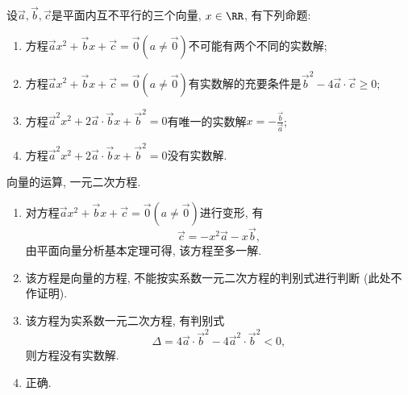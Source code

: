 \documentclass[8pt]{article}
\begin{document}
		\begin{easonbigproblem}
			设\(\vec{a}, \vec{b}, \vec{c}\)是平面内互不平行的三个向量, \(x \in \RR\), 有下列命题:
			\begin{enumerate}[label=\calword{(\arabic*)}]
				\item 方程\(\vec{a} x^2 + \vec{b} x + \vec{c} = \vec{0} (a \neq \vec{0})\)不可能有两个不同的实数解;
				\item 方程\(\vec{a} x^2 + \vec{b} x + \vec{c} = \vec{0} (a \neq \vec{0})\)有实数解的充要条件是\(\vec{b}^2 - 4 \vec{a} \cdot \vec{c} \geq 0\);
				\item 方程\(\vec{a}^2 x^2 + 2\vec{a} \cdot \vec{b} x + \vec{b}^2 = 0\)有唯一的实数解\(x = - \displaystyle \frac{\vec{b}}{\vec{a}}\);
				\item 方程\(\vec{a}^2 x^2 + 2\vec{a} \cdot \vec{b} x + \vec{b}^2 = 0\)没有实数解.
			\end{enumerate}
			\subbigproblem
			 向量的运算, 一元二次方程.
			\begin{enumerate}[label=\calword{(\arabic*)}]
				\item 对方程\(\vec{a} x^2 + \vec{b} x + \vec{c} = \vec{0} (a \neq \vec{0})\)进行变形, 有
					\begin{displaymath}
						\vec{c} = -x^2 \vec{a} - x\vec{b},
					\end{displaymath}
					由平面向量分析基本定理可得, 该方程至多一解.
				\item 该方程是向量的方程, 不能按实系数一元二次方程的判别式进行判断 (此处不作证明).
				\item 该方程为实系数一元二次方程, 有判别式
					\begin{displaymath}
						\Delta = 4 \vec{a} \cdot \vec{b}^2 - 4 \vec{a}^2 \cdot \vec{b}^2 < 0,
					\end{displaymath}
					则方程没有实数解.
				\item 正确.
			\end{enumerate}
		\end{easonbigproblem}
\end{document}
